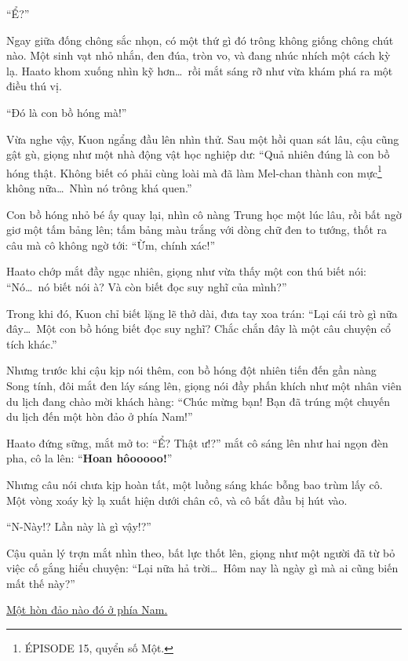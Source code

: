 \documentclass[../main.tex]{subfiles}
\begin{document}
``Ể?''

Ngay giữa đống chông sắc nhọn, có một thứ gì đó trông không giống chông chút nào. Một sinh vạt nhỏ nhắn, đen đúa, tròn vo, và đang nhúc nhích một cách kỳ lạ. Haato khom xuống nhìn kỹ hơn\dots\ rồi mắt sáng rỡ như vừa khám phá ra một điều thú vị.

``Đó là con bồ hóng mà!''

Vừa nghe vậy, Kuon ngẩng đầu lên nhìn thử. Sau một hồi quan sát lâu, cậu cũng gật gù, giọng như một nhà động vật học nghiệp dư: ``Quả nhiên đúng là con bồ hóng thật. Không biết có phải cùng loài mà đã làm Mel-chan thành con mực\footnote{{\flaregothic ÉPISODE 15}, quyển số Một.} không nữa\dots\ Nhìn nó trông khá quen.''

Con bồ hóng nhỏ bé ấy quay lại, nhìn cô nàng Trung học một lúc lâu, rồi bất ngờ giơ một tấm bảng lên; tấm bảng màu trắng với dòng chữ đen to tướng, thốt ra câu mà cô không ngờ tới: ``Ừm, chính xác!''


Haato chớp mắt đầy ngạc nhiên, giọng như vừa thấy một con thú biết nói: ``Nó\dots\ nó biết nói à? Và còn biết đọc suy nghĩ của mình?''

Trong khi đó, Kuon chỉ biết lặng lẽ thở dài, đưa tay xoa trán: ``Lại cái trò gì nữa đây\dots\ Một con bồ hóng biết đọc suy nghĩ? Chắc chắn đây là một câu chuyện cổ tích khác.''

Nhưng trước khi cậu kịp nói thêm, con bồ hóng đột nhiên tiến đến gần nàng Song tính, đôi mắt đen láy sáng lên, giọng nói đầy phấn khích như một nhân viên du lịch đang chào mời khách hàng: ``Chúc mừng bạn! Bạn đã trúng một chuyến du lịch đến một hòn đảo ở phía Nam!''

Haato đứng sững, mắt mở to: ``Ể? Thật ư!?'' mắt cô sáng lên như hai ngọn đèn pha, cô la lên: ``\textbf{Hoan hôooooo!}''

Nhưng câu nói chưa kịp hoàn tất, một luồng sáng khác bỗng bao trùm lấy cô. Một vòng xoáy kỳ lạ xuất hiện dưới chân cô, và cô bắt đầu bị hút vào.

``N-Này!? Lần này là gì vậy!?''

Cậu quản lý trợn mắt nhìn theo, bất lực thốt lên, giọng như một người đã từ bỏ việc cố gắng hiểu chuyện: ``Lại nữa hả trời\dots\ Hôm nay là ngày gì mà ai cũng biến mất thế này?''

\begin{center}
  \uline{Một hòn đảo nào đó ở phía Nam.}
\end{center}

\end{document}
